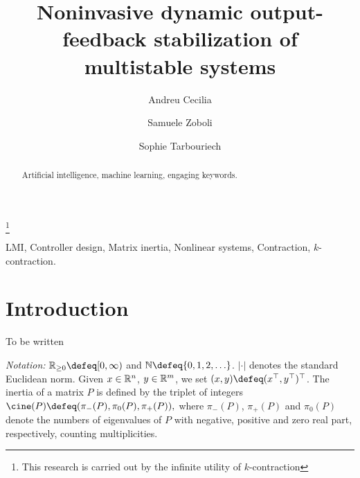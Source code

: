 \documentclass{ifacconf}
\begin{document}
	\begin{frontmatter}
		
		\title{Noninvasive dynamic output-feedback stabilization of multistable systems} 
		
		\thanks[footnoteinfo]{This research is carried out by the infinite utility of $k$-contraction}
		
		\author[First]{Andreu Cecilia} 		
        \author[Second]{Samuele Zoboli}
	\author[Second]{Sophie Tarbouriech}
 
		\address[First]{Universitat Polit\`ecnica de Catalunya, Avinguda Diagonal, 647, 08028 Barcelona, Spain, (e-mail: andreu.cecilia@upc.edu)}
  \address[Second]{LAAS-CNRS, Universit\'e de Toulouse, CNRS, Toulouse, (e-mail: samuele.zoboli@laas.fr, sophie.tarbouriech@laas.fr)}
		
		\begin{abstract}                %
   Artificial intelligence, machine learning, engaging keywords.
		\end{abstract}
		
		\begin{keyword}
			LMI, Controller design, Matrix inertia, Nonlinear systems, Contraction, $k$-contraction.
		\end{keyword}
		
	\end{frontmatter}


\section{Introduction}
{\color{red} To be written}

\medskip
\emph{Notation:}  $\RR_{\geq0}\defeq[0,\infty)$ and
$\NN \defeq \{0,1,2,\ldots\}$. $|\cdot|$ denotes the standard Euclidean norm.
Given $x\in {\mathbb{R}}^n$, $y\in {\mathbb{R}}^m$, we set 
$(x,y)\defeq (x^\top , y^\top)^\top$.
The inertia of a matrix $P$ 
is defined by the triplet of integers
$
\cine(P) \defeq (\pi_{-}(P),  \pi_{0}(P), \pi_{+}(P)),
$
where $\pi_{-}({P})$, $\pi_{+}(P)$ and $\pi_{0}(P)$ denote the numbers of eigenvalues of $P$ with negative,
positive and zero real part, respectively, counting multiplicities. 
\end{document}
